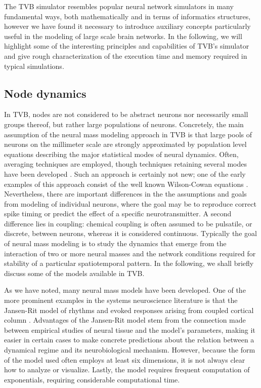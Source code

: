 The TVB simulator resembles popular neural network simulators in 
many fundamental ways, both mathematically and in terms of informatics 
structures, however we have found it necessary to introduce auxiliary
concepts particularly useful in the modeling of large scale brain 
networks. In the following, we will highlight some of the interesting
principles and capabilities of TVB's simulator and give rough characterization
of the execution time and memory required in typical simulations.

\subsection{Node dynamics}

	In TVB, nodes are not considered to be abstract neurons nor necessarily 
	small groups thereof, but rather large populations of neurons. Concretely, 
	the main assumption of the neural mass modeling approach in TVB is that
	large pools of neurons on the millimeter scale are strongly approximated
	by population level equations describing the major statistical modes of 
	neural dynamics. Often, averaging techniques are employed, though techniques
	retaining several modes have been developed \cite{Stefanescu_2011}.
	Such an approach is certainly not new; one of the early
	examples of this approach consist of the well known Wilson-Cowan equations
	\cite{Wilson_1973}. Nevertheless, there are important differences in the
	the assumptions and goals from modeling of individual neurons, where the
	goal may be to reproduce correct spike timing or predict the effect of 
	a specific neurotransmitter. A second difference lies in coupling:
	chemical coupling is often assumed to be pulsatile, or discrete, between neurons, whereas
	it is considered continuous.
	Typically the goal of neural mass modeling
	is to study the dynamics that emerge from the interaction of two
	or more neural masses and the network conditions required for stability
	of a particular spatiotemporal pattern. In the following, we shall 
	briefly discuss some of the models available in TVB.

	As we have noted, many neural mass models have been developed. One of
	the more prominent examples in the systems neuroscience literature is 
	that the Jansen-Rit model of rhythms and evoked responses arising from
	coupled cortical column \cite{Jansen_1995}. 
	Advantages of the Jansen-Rit model stem from the connection made
	between empirical studies of neural tissue and the model's parameters, 
	making it easier in certain cases to make concrete predictions about
	the relation between a dynamical regime and its neurobiological 
	mechanism. However, because the form of the model used often employs
	at least six dimensions, it is not always clear how to analyze or
	visualize. Lastly, the model requires frequent computation of exponentials,
	requiring considerable computational time. 

